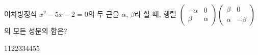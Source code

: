 \hspace*{2mm}\begin{minipage}[t]{\dimexpr\linewidth-2mm\relax}\vspace{0pt}
이차방정식 $x^2-5x-2=0$의 두 근을 $\alpha$, $\beta$라 할 때, 행렬 $\begin{pmatrix} -\alpha & 0 \\ \beta & \alpha \end{pmatrix}\begin{pmatrix} \beta & 0 \\ \alpha & -\beta \end{pmatrix}$의 모든 성분의 합은?
\begin{choices32}{11}{22}{33}{44}{55}\end{choices32}\end{minipage}
